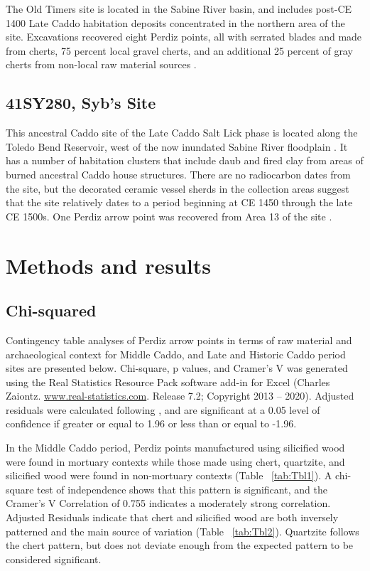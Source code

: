 \documentclass[review]{elsarticle}
\begin{document}
The Old Timers site is located in the Sabine River basin, and includes post-CE 1400 Late Caddo habitation deposits concentrated in the northern area of the site. Excavations recovered eight Perdiz points, all with serrated blades and made from cherts, 75 percent local gravel cherts, and an additional 25 percent of gray cherts from non-local raw material sources \citep[77]{RN8966}.

\subsection*{41SY280, Syb’s Site} 

This ancestral Caddo site of the Late Caddo Salt Lick phase is located along the Toledo Bend Reservoir, west of the now inundated Sabine River floodplain \citep[Figure 55]{RN8966}. It has a number of habitation clusters that include daub and fired clay from areas of burned ancestral Caddo house structures. There are no radiocarbon dates from the site, but the decorated ceramic vessel sherds in the collection areas suggest that the site relatively dates to a period beginning at CE 1450 through the late CE 1500s. One Perdiz arrow point was recovered from Area 13 of the site \citep[Table 33]{RN8966}.

\section*{Methods and results}

\subsection*{Chi-squared}

Contingency table analyses of Perdiz arrow points in terms of raw material and archaeological context for Middle Caddo, and Late and Historic Caddo period sites are presented below. Chi-square, p values, and Cramer’s V was generated using the Real Statistics Resource Pack software add-in for Excel (Charles Zaiontz. \href{www.real-statistics.com}{www.real-statistics.com}. Release 7.2; Copyright 2013 – 2020). Adjusted residuals were calculated following \citet{RN8987}, and are significant at a 0.05 level of confidence if greater or equal to 1.96 or less than or equal to -1.96. 

In the Middle Caddo period, Perdiz points manufactured using silicified wood were found in mortuary contexts while those made using chert, quartzite, and silicified wood were found in non-mortuary contexts (Table ~\ref{tab:Tbl1}). A chi-square test of independence shows that this pattern is significant, and the Cramer’s V Correlation of 0.755 indicates a moderately strong correlation. Adjusted Residuals indicate that chert and silicified wood are both inversely patterned and the main source of variation (Table ~\ref{tab:Tbl2}). Quartzite follows the chert pattern, but does not deviate enough from the expected pattern to be considered significant.
\end{document}
